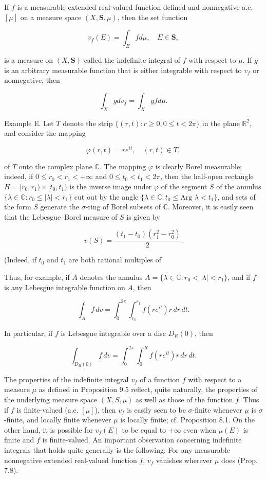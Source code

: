 If $f$ is a measurable extended real-valued function defined and nonnegative a.e. $[\mu]$ on a measure space $(X, \mathbf{S}, \mu)$, then the set function

$$v_f(E) = \int_E f d\mu, \quad E \in \mathbf{S},$$

is a measure on $(X, \mathbf{S})$ called the indefinite integral of $f$ with respect to $\mu$. If $g$ is an arbitrary measurable function that is either integrable with respect to $v_f$ or nonnegative, then

$$\int_X g dv_f = \int_X gf d\mu.$$

Example E. Let $T$ denote the strip $\{(r, t) : r \geq 0, 0 \leq t < 2\pi\}$ in the plane $\mathbb{R}^2$, and consider the mapping

$$\varphi(r, t) = re^{it}, \quad (r, t) \in T,$$

of $T$ onto the complex plane $\mathbb{C}$. The mapping $\varphi$ is clearly Borel measurable; indeed, if $0 \leq r_0 < r_1 < +\infty$ and $0 \leq t_0 < t_1 < 2\pi$, then the half-open rectangle $H = [r_0, r_1) \times [t_0, t_1)$ is the inverse image under $\varphi$ of the segment $S$ of the annulus $\{\lambda \in \mathbb{C}: r_0 \leq |\lambda| < r_1\}$ cut out by the angle $\{\lambda \in \mathbb{C}: t_0 \leq \text{Arg } \lambda < t_1\}$, and sets of the form $S$ generate the $\sigma$-ring of Borel subsets of $\mathbb{C}$. Moreover, it is easily seen that the Lebesgue–Borel measure of $S$ is given by

$$v(S) = \frac{(t_1 - t_0)(r_1^2 - r_0^2)}{2}.$$

(Indeed, if $t_0$ and $t_1$ are both rational multiples of

Thus, for example, if $A$ denotes the annulus $A = \{\lambda \in \mathbb{C} : r_0 < |\lambda| < r_1\}$, and if $f$ is any Lebesgue integrable function on $A$, then

$$\int_A f \, dv = \int_0^{2\pi} \int_{r_0}^{r_1} f(re^{it})r \, dr \, dt.$$

In particular, if $f$ is Lebesgue integrable over a disc $D_R(0)$, then

$$\int_{D_R(0)} f \, dv = \int_0^{2\pi} \int_0^{R} f(re^{it})r \, dr \, dt.$$

The properties of the indefinite integral $v_f$ of a function $f$ with respect to a measure $\mu$ as defined in Proposition 9.5 reflect, quite naturally, the properties of the underlying measure space $(X, S, \mu)$ as well as those of the function $f$. Thus if $f$ is finite-valued (a.e. $[\mu]$), then $v_f$ is easily seen to be $\sigma$-finite whenever $\mu$ is $\sigma$-finite, and locally finite whenever $\mu$ is locally finite; cf. Proposition 8.1. On the other hand, it is possible for $v_f(E)$ to be equal to $+\infty$ even when $\mu(E)$ is finite and $f$ is finite-valued. An important observation concerning indefinite integrals that holds quite generally is the following: For any measurable nonnegative extended real-valued function $f$, $v_f$ vanishes wherever $\mu$ does (Prop. 7.8).
